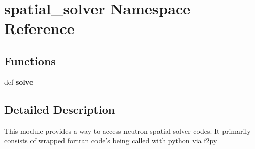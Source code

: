 \hypertarget{namespacespatial__solver}{\section{spatial\-\_\-solver Namespace Reference}
\label{namespacespatial__solver}
}
\subsection*{Functions}
\begin{DoxyCompactItemize}
\item 
\hypertarget{namespacespatial__solver_a74df1ca1dc48fff51fcfba3ef46add94}{def {\bfseries solve}}\label{namespacespatial__solver_a74df1ca1dc48fff51fcfba3ef46add94}

\end{DoxyCompactItemize}


\subsection{Detailed Description}
\begin{DoxyVerb}This module provides a way to access neutron spatial solver codes.  It primarily consists of wrapped fortran code's being called with python via f2py\end{DoxyVerb}
 